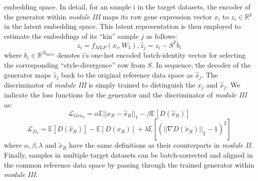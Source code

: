 \documentclass{article}
\begin{document}
embedding space. In detail, for an sample i in the target datasets, the encoder of 
the generator within \textit{module III} maps its raw gene expression vector 
$x_i$ to $z_i\in\mathbb{R}^p$ in the latent embedding space. This latent representation is 
then employed to estimate the embeddings of its “kin” sample $j$ as follows:
\begin{equation}
z_i=f_{\textit{MLP}}(x_i,W_5), {\widehat{z}}_j = z_i-S^T b_i
\end{equation}
where $b_i\in\mathbb{R}^{N_{batch}}$ denotes {i}'s one-hot encoded batch-identity vector for 
selecting the corresponding “style-divergence” row from $S$. In sequence, the decoder of the 
generator maps ${\widehat{z}}_j$ back to the original reference data space as ${\widehat{x}}_j$. The 
discriminator of \textit{module III} is simply trained to distinguish the $x_j$ and ${\widehat{x}}_j$. We 
indicate the loss functions for the generator and the discriminator of \textit{module III} as:
\begin{equation}
\mathcal{L}_{Gen_3}=\alpha\mathbb{E}{||x_R- \widehat{x}_R||}_1-\beta\mathbb{E}[D(\widehat{x}_R)]
\end{equation}
\begin{equation}
\mathcal{L}_{D_3}=\mathbb{E}\left[D\left(\widehat{x}_R\right)\right]-\mathbb{E}\left[D\left(x_R\right)\right]+\lambda\mathbb{E}[{({||\nabla D(\widetilde{x}_R)||}_2-1)}^2]
\end{equation}
where $\alpha,\beta,\lambda$ and $\widetilde{x}_R$ have the same definitions as 
their counterparts in \textit{module II}. Finally, samples in multiple target datasets can be 
batch-corrected and aligned in the common reference data space by passing through the 
trained generator within \textit{module III}.
\end{document}

